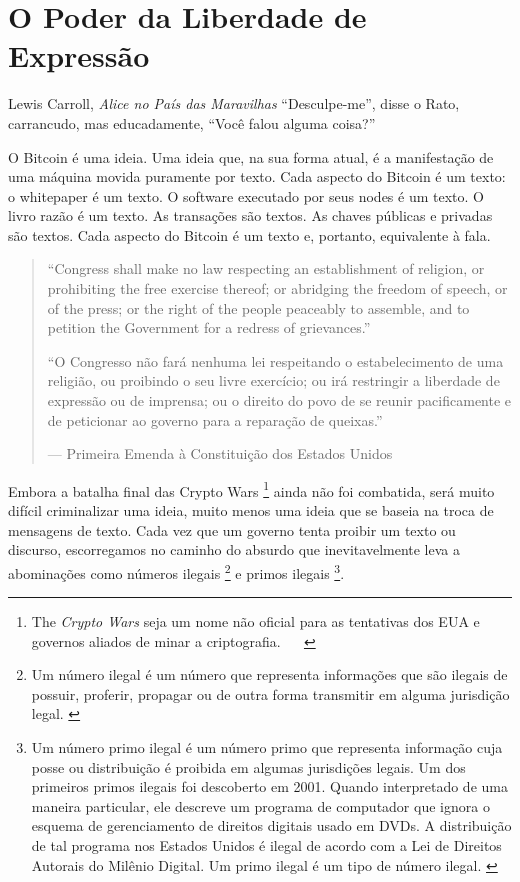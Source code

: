 \chapter{O Poder da Liberdade de Expressão}
\label{les:6}

\begin{chapquote}{Lewis Carroll, \textit{Alice no País das Maravilhas}}
\enquote{Desculpe-me}, disse o Rato, carrancudo, mas educadamente, \enquote{Você falou alguma coisa?}
\end{chapquote}

O Bitcoin é uma ideia. Uma ideia que, na sua forma atual, é a manifestação de uma máquina movida puramente por texto. Cada aspecto do Bitcoin é um texto: o whitepaper é um texto. O software executado por seus nodes é um texto. O livro razão é um texto. As transações são textos. As chaves públicas e privadas são textos. Cada aspecto do Bitcoin é um texto e, portanto, equivalente à fala.

\begin{quotation}\begin{samepage}
\enquote{Congress shall make no law respecting an establishment of religion,
or prohibiting the free exercise thereof; or abridging the freedom of
speech, or of the press; or the right of the people peaceably to
assemble, and to petition the Government for a redress of grievances.}

\enquote{O Congresso não fará nenhuma lei respeitando o estabelecimento de uma religião, ou proibindo o seu livre exercício; ou irá restringir a liberdade de expressão ou de imprensa; ou o direito do povo de se reunir pacificamente e de peticionar ao governo para a reparação de queixas.}
\begin{flushright} --- Primeira Emenda à Constituição dos Estados Unidos
\end{flushright}\end{samepage}\end{quotation}

Embora a batalha final das Crypto Wars \footnote{The \textit{Crypto Wars} seja um nome não oficial para as tentativas dos EUA e governos aliados de minar a criptografia. ~\cite{eff-cryptowars} ~\cite{wiki:cryptowars}} ainda não foi combatida, será muito difícil criminalizar uma ideia, muito menos uma ideia que se baseia na troca de mensagens de texto. Cada vez que um governo tenta proibir um texto ou discurso, escorregamos no caminho do absurdo que inevitavelmente leva a abominações como números ilegais \footnote{Um número ilegal é um número que representa informações que são ilegais de possuir, proferir, propagar ou de outra forma transmitir em alguma jurisdição legal. \cite{wiki:illegal-number}} e primos ilegais \footnote{Um número primo ilegal é um número primo que representa informação cuja posse ou distribuição é proibida em algumas jurisdições legais. Um dos primeiros primos ilegais foi descoberto em 2001. Quando interpretado de uma maneira particular, ele descreve um programa de computador que ignora o esquema de gerenciamento de direitos digitais usado em DVDs. A distribuição de tal programa nos Estados Unidos é ilegal de acordo com a Lei de Direitos Autorais do Milênio Digital. Um primo ilegal é um tipo de número ilegal. \cite{wiki:illegal-prime}}.

